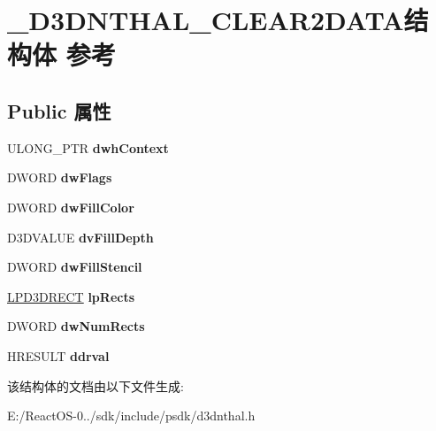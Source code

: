 \hypertarget{struct___d3_d_n_t_h_a_l___c_l_e_a_r2_d_a_t_a}{}\section{\+\_\+\+D3\+D\+N\+T\+H\+A\+L\+\_\+\+C\+L\+E\+A\+R2\+D\+A\+T\+A结构体 参考}
\label{struct___d3_d_n_t_h_a_l___c_l_e_a_r2_d_a_t_a}
\subsection*{Public 属性}
\begin{DoxyCompactItemize}
\item 
\mbox{\label{struct___d3_d_n_t_h_a_l___c_l_e_a_r2_d_a_t_a_a0362af33940e98d205427c829cac4152}} 
U\+L\+O\+N\+G\+\_\+\+P\+TR {\bfseries dwh\+Context}
\item 
\mbox{\label{struct___d3_d_n_t_h_a_l___c_l_e_a_r2_d_a_t_a_a9a49a9f32cd4abf8cd4366ede8f5e7ad}} 
D\+W\+O\+RD {\bfseries dw\+Flags}
\item 
\mbox{\label{struct___d3_d_n_t_h_a_l___c_l_e_a_r2_d_a_t_a_a3ec045f1c95c535bfc38254fc934e1ef}} 
D\+W\+O\+RD {\bfseries dw\+Fill\+Color}
\item 
\mbox{\label{struct___d3_d_n_t_h_a_l___c_l_e_a_r2_d_a_t_a_ae420c53f070ca2ce893513464c06cb0b}} 
D3\+D\+V\+A\+L\+UE {\bfseries dv\+Fill\+Depth}
\item 
\mbox{\label{struct___d3_d_n_t_h_a_l___c_l_e_a_r2_d_a_t_a_a1c16226479efd98ae6a313a09e2ba6f2}} 
D\+W\+O\+RD {\bfseries dw\+Fill\+Stencil}
\item 
\mbox{\label{struct___d3_d_n_t_h_a_l___c_l_e_a_r2_d_a_t_a_a0efa51f9f786f7a0bc37b9df82b778e1}} 
\hyperlink{struct___d3_d_r_e_c_t}{L\+P\+D3\+D\+R\+E\+CT} {\bfseries lp\+Rects}
\item 
\mbox{\label{struct___d3_d_n_t_h_a_l___c_l_e_a_r2_d_a_t_a_a92804d35d77ed65400e0b7ada4d2769e}} 
D\+W\+O\+RD {\bfseries dw\+Num\+Rects}
\item 
\mbox{\label{struct___d3_d_n_t_h_a_l___c_l_e_a_r2_d_a_t_a_ada82b4a94f39f4811cf5875ca9ae83bc}} 
H\+R\+E\+S\+U\+LT {\bfseries ddrval}
\end{DoxyCompactItemize}


该结构体的文档由以下文件生成\+:\begin{DoxyCompactItemize}
\item 
E\+:/\+React\+O\+S-\/0../sdk/include/psdk/d3dnthal.\+h\end{DoxyCompactItemize}
